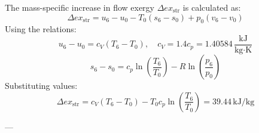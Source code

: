 The mass-specific increase in flow exergy \( \Delta ex_{\text{str}} \) is calculated as:  
\[
\Delta ex_{\text{str}} = u_6 - u_0 - T_0 \left( s_6 - s_0 \right) + p_0 \left( v_6 - v_0 \right)
\]  
Using the relations:  
\[
u_6 - u_0 = c_V \left( T_6 - T_0 \right), \quad c_V = 1.4 c_p = 1.40584 \, \frac{\text{kJ}}{\text{kg·K}}
\]  
\[
s_6 - s_0 = c_p \ln \left( \frac{T_6}{T_0} \right) - R \ln \left( \frac{p_6}{p_0} \right)
\]  
Substituting values:  
\[
\Delta ex_{\text{str}} = c_V \left( T_6 - T_0 \right) - T_0 c_p \ln \left( \frac{T_6}{T_0} \right) = 39.44 \, \text{kJ/kg}
\]

---